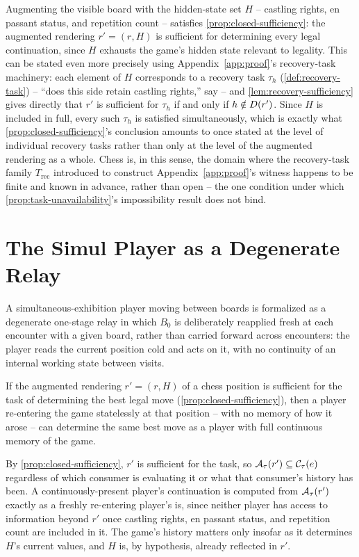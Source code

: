 Augmenting the visible board with the hidden-state set $H$ -- castling
rights, en passant status, and repetition count -- satisfies
\cref{prop:closed-sufficiency}:
the augmented rendering $r' = (r, H)$ is sufficient for determining every
legal continuation, since $H$ exhausts the game's hidden state relevant
to legality. This can be stated even more precisely using
Appendix~\ref{app:proof}'s recovery-task machinery: each element of $H$
corresponds to a recovery task $\tau_h$ (\cref{def:recovery-task}) --
``does this side retain castling rights,'' say -- and
\cref{lem:recovery-sufficiency} gives directly that $r'$ is sufficient
for $\tau_h$ if and only if $h \notin D(r')$. Since $H$ is
included in full, every such $\tau_h$ is satisfied simultaneously, which
is exactly what \cref{prop:closed-sufficiency}'s conclusion amounts to
once stated at the level of individual recovery tasks rather than only
at the level of the augmented rendering as a whole. Chess is, in this
sense, the domain where the recovery-task family $T_{\mathrm{rec}}$
introduced to construct Appendix~\ref{app:proof}'s witness happens to be
finite and known in advance, rather than open -- the one condition
under which \cref{prop:task-unavailability}'s impossibility result does
not bind.

\section{The Simul Player as a Degenerate Relay}

A simultaneous-exhibition player moving between boards is formalized as a
degenerate one-stage relay in which $B_0$ is deliberately reapplied fresh
at each encounter with a given board, rather than carried forward across
encounters: the player reads the current position cold and acts on it,
with no continuity of an internal working state between visits.

\begin{proposition}
\label{prop:stateless-reentry}
If the augmented rendering $r' = (r, H)$ of a chess position is
sufficient for the task of determining the best legal move
(\cref{prop:closed-sufficiency}), then a player re-entering the game
statelessly at that position -- with no memory of how it arose -- can
determine the same best move as a player with full continuous memory of
the game.
\end{proposition}

\begin{proofsketch}
By \cref{prop:closed-sufficiency}, $r'$ is sufficient for the task, so
$\mathcal{A}_{\tau}(r') \subseteq \mathcal{C}_\tau(e)$ regardless of which
consumer is evaluating it or what that consumer's history has been. A
continuously-present player's continuation is computed from
$\mathcal{A}_{\tau}(r')$ exactly as a freshly re-entering player's is, since
neither player has access to information beyond $r'$ once castling
rights, en passant status, and repetition count are included in it. The
game's history matters only insofar as it determines $H$'s current
values, and $H$ is, by hypothesis, already reflected in $r'$.
\end{proofsketch}

